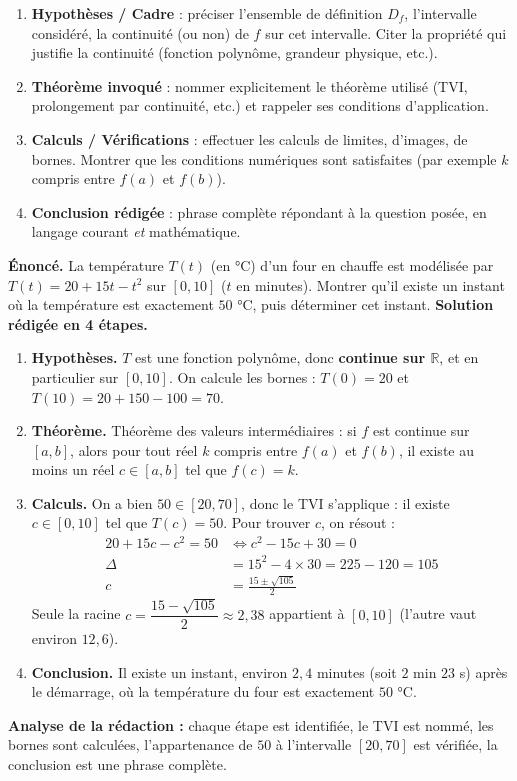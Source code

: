 \documentclass[11pt]{article}
\begin{document}
\begin{methode}
\begin{enumerate}
\item \textbf{Hypothèses / Cadre} : préciser l'ensemble de définition $D_f$, l'intervalle considéré, la continuité (ou non) de $f$ sur cet intervalle. Citer la propriété qui justifie la continuité (fonction polynôme, grandeur physique, etc.).
\item \textbf{Théorème invoqué} : nommer explicitement le théorème utilisé (TVI, prolongement par continuité, etc.) et rappeler ses conditions d'application.
\item \textbf{Calculs / Vérifications} : effectuer les calculs de limites, d'images, de bornes. Montrer que les conditions numériques sont satisfaites (par exemple $k$ compris entre $f(a)$ et $f(b)$).
\item \textbf{Conclusion rédigée} : phrase complète répondant à la question posée, en langage courant \emph{et} mathématique.
\end{enumerate}
\end{methode}

\begin{exoresolu}
\textbf{Énoncé.} La température $T(t)$ (en °C) d'un four en chauffe est modélisée par $T(t)=20+15t-t^2$ sur $[0,10]$ ($t$ en minutes). Montrer qu'il existe un instant où la température est exactement $50$ °C, puis déterminer cet instant.
\tcblower
\textbf{Solution rédigée en 4 étapes.}
\begin{enumerate}
\item \textbf{Hypothèses.} $T$ est une fonction polynôme, donc \textbf{continue sur $\mathbb{R}$}, et en particulier sur $[0,10]$. On calcule les bornes : $T(0)=20$ et $T(10)=20+150-100=70$.
\item \textbf{Théorème.} Théorème des valeurs intermédiaires : si $f$ est continue sur $[a,b]$, alors pour tout réel $k$ compris entre $f(a)$ et $f(b)$, il existe au moins un réel $c\in[a,b]$ tel que $f(c)=k$.
\item \textbf{Calculs.} On a bien $50\in[20,70]$, donc le TVI s'applique : il existe $c\in[0,10]$ tel que $T(c)=50$. Pour trouver $c$, on résout :
\begin{align*}
20+15c-c^2=50 &\iff c^2-15c+30=0\\
\Delta &= 15^2-4\times 30 = 225-120=105\\
c &= \frac{15\pm\sqrt{105}}{2}
\end{align*}
Seule la racine $c=\dfrac{15-\sqrt{105}}{2}\approx 2,38$ appartient à $[0,10]$ (l'autre vaut environ $12,6$).
\item \textbf{Conclusion.} Il existe un instant, environ $2,4$ minutes (soit $2$ min $23$ s) après le démarrage, où la température du four est exactement $50$ °C.
\end{enumerate}
\textbf{Analyse de la rédaction :} chaque étape est identifiée, le TVI est nommé, les bornes sont calculées, l'appartenance de $50$ à l'intervalle $[20,70]$ est vérifiée, la conclusion est une phrase complète.
\end{exoresolu}
\end{document}
